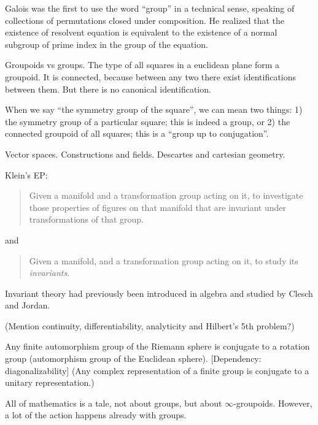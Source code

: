 Galois was the first to use the word ``group'' in a technical sense,
speaking of collections of permutations closed under composition.
He realized that the existence of resolvent equation is equivalent
to the existence of a normal subgroup of prime index
in the group of the equation.

Groupoids vs groups.
The type of all squares in a euclidean plane form a groupoid.
It is connected,
because between any two there exist identifications between them.
But there is no canonical identification.

When we say ``the symmetry group of the square'',
we can mean two things:
1) the symmetry group of a particular square;
this is indeed a group,
or 2) the connected groupoid of all squares;
this is a ``group up to conjugation''.

Vector spaces. Constructions and fields. Descartes and cartesian geometry.

Klein's EP:
\begin{quote}
  Given a manifold and a transformation group acting on it,
  to investigate those properties of figures on that manifold
  that are invariant under transformations of that group.
\end{quote}
and
\begin{quote}
  Given a manifold, and a transformation group acting on it,
  to study its \emph{invariants}.
\end{quote}
Invariant theory had previously been introduced in algebra
and studied by Clesch and Jordan.

(Mention continuity, differentiability, analyticity and Hilbert's 5th problem?)

Any finite automorphism group of the Riemann sphere is conjugate to a
rotation group (automorphism group of the Euclidean sphere).
[Dependency: diagonalizability] (Any complex representation of a
finite group is conjugate to a unitary representation.)


All of mathematics is a tale, not about groups,
but about $\infty$-groupoids.
However, a lot of the action happens already with groups.

